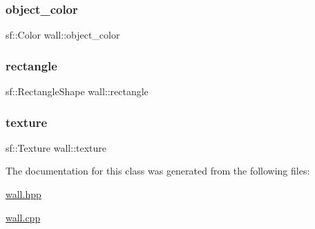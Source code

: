 \mbox{\label{classwall_ada0e26614b5f30c0f675d179d517bafb}} 
\subsubsection{\texorpdfstring{object\+\_\+color}{object\_color}}
{\footnotesize\ttfamily sf\+::\+Color wall\+::object\+\_\+color\hspace{0.3cm}{\ttfamily [private]}}

\mbox{\label{classwall_a29b74cbef8c1cb110c526fdf4a8f48ba}} 
\subsubsection{\texorpdfstring{rectangle}{rectangle}}
{\footnotesize\ttfamily sf\+::\+Rectangle\+Shape wall\+::rectangle\hspace{0.3cm}{\ttfamily [private]}}

\mbox{\label{classwall_a03e6d768bc82f6320d85f19ce0346f95}} 
\subsubsection{\texorpdfstring{texture}{texture}}
{\footnotesize\ttfamily sf\+::\+Texture wall\+::texture\hspace{0.3cm}{\ttfamily [private]}}



The documentation for this class was generated from the following files\+:\begin{DoxyCompactItemize}
\item 
\hyperlink{wall_8hpp}{wall.\+hpp}\item 
\hyperlink{wall_8cpp}{wall.\+cpp}\end{DoxyCompactItemize}
